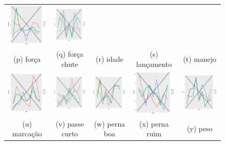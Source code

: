 \documentclass[review]{elsarticle}
\begin{document}
\begin{figure}
\begin{tabular}{ccccc}
  \includegraphics[width=25mm]{lancamento_result_trans}  & \includegraphics[width=25mm]{manejo_result_trans}  \\
 \scriptsize{(p) força} & \scriptsize{(q) força chute } & \scriptsize{(r) idade} & \scriptsize{(s) lançamento} & \scriptsize{(t) manejo}\\[3pt]
 
   \includegraphics[width=25mm]{marcacao_result_trans} & \includegraphics[width=25mm]{passecurto_result_trans}   &   \includegraphics[width=25mm]{pernaboa_result_trans}&
  \includegraphics[width=25mm]{pernaruim_result_trans}   & \includegraphics[width=25mm]{peso_result_trans}   \\
 \scriptsize{(u) marcação} & \scriptsize{(v) passe curto } & \scriptsize{(w) perna boa} & \scriptsize{(x) perna ruim} & \scriptsize{(y) peso}\\[3pt]
 

\end{tabular}
\end{figure}
\end{document}
